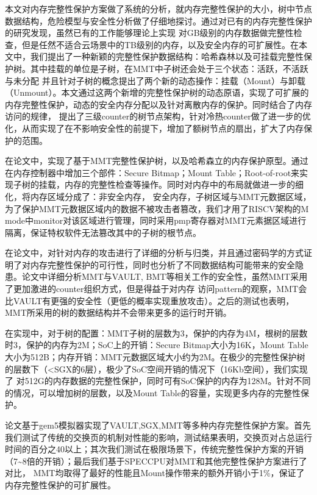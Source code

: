 
\begin{summary}
本文对内存完整性保护方案做了系统的分析，就内存完整性保护的大小，树中节点数据结构，危险模型与安全性分析做了仔细地探讨。通过对已有的内存完整性保护的研究发现，虽然已有的工作能够理论上实现
对GB级别的内存数据做完整性检查，但是任然不适合云场景中的TB级别的内存，以及安全内存的可扩展性。在本文中，我们提出了一种新颖的完整性保护数据结构：哈希森林以及可挂载完整性保护树。其中挂载的单位是子树，在MMT中子树还会处于三个状态：活跃，不活跃与未分配
并且针对子树的概念提出了两个新的动态操作：挂载（Mount）与卸载（Unmount）。本文通过这两个新增的完整性保护树的动态原语，实现了可扩展的内存完整性保护，动态的安全内存分配以及针对离散内存的保护。同时结合了内存访问的规律，
提出了三级counter的树节点架构，针对冷热counter做了进一步的优化，从而实现了在不影响安全性的前提下，增加了额树节点的扇出，扩大了内存保护的范围。

在论文中，实现了基于MMT完整性保护树，以及哈希森立的内存保护原型。通过在内存控制器中增加三个部件：Secure Bitmap；Mount Table；Root-of-root来实现子树的挂载，内存的完整性检查等操作。同时对内存中的布局就做进一步的细化，将内存区域分成了：非安全内存，
安全内存，子树区域与MMT元数据区域，为了保护MMT元数据区域内的数据不被攻击者篡改，我们才用了RISCV架构的M mode中monitor对该区域进行管理，同时采用pmp寄存器对MMT元素据区域进行隔离，保证特权软件无法篡改其中的子树的根节点。

在论文中，对针对内存的攻击进行了详细的分析与归类，并且通过密码学的方式证明了对内存完整性保护的可行性，同时也分析了不同数据结构可能带来的安全隐患。论文中详细分析MMT与VAULT, BMT等相关工作的安全性，虽然MMT采用了更加激进的counter组织方式，但是得益于对内存
访问pattern的观察，MMT会比VAULT有更强的安全性（更低的概率实现重放攻击）。之后的测试也表明，MMT所采用的树的数据结构并不会带来更多的运行时开销。

在实现中，对于树的配置：MMT子树的层数为3，保护的内存为4M，根树的层数时3，保护的内存为2M；SoC上的开销：Secure Bitmap大小为16K，Mount Table大小为512B；内存开销：MMT元数据区域大小约为2M。在极少的完整性保护树的层数下（<SGX的6层），极少了SoC空间开销的情况下（16Kb空间），我们实现了
对512G的内存数据的完整性保护，同时可有SoC保护的内存为128M。针对不同的情况，可以增加树的层数，以及Mount Table的容量，实现更多内存的完整性保护。

论文基于gem5模拟器实现了VAULT,SGX,MMT等多种内存完整性保护方案。首先我们测试了传统的交换页的机制对性能的影响，测试结果表明，交换页对占总运行时间的百分之40以上；其次我们测试在极限场景下，传统完整性保护方案的开销（7\sim8倍的开销）；最后我们基于SPECCPU对MMT和其他完整性保护方案进行了对比，
MMT均取得了最好的性能且Mount操作带来的额外开销小于1\%，保证了内存完整性保护的可扩展性。
\end{summary}
